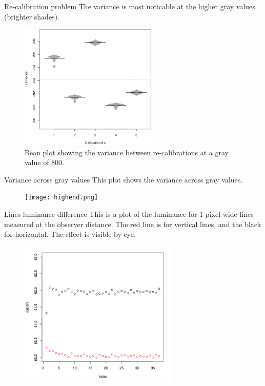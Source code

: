 \documentclass{beamer}
\begin{document}
\begin{frame}[t]{Re-calibration problem}
The variance is most noticable at the higher gray values (brighter shades).

\begin{figure}[c]
\includegraphics[height=6cm]{cbeanplotmean_800_color.png}
\caption{Bean plot showing the variance between re-calibrations at a gray value of 800.}
\end{figure}
\end{frame}

\begin{frame}[t]{Variance across gray values}
This plot shows the variance across gray values.
\begin{figure}[c]
\texttt{[image: highend.png]}
\end{figure}
\end{frame}



\begin{frame}[t]{Lines luminance difference}
This is a plot of the luminance for 1-pixel wide lines measured at the observer distance. The red line is for vertical lines, and the black for horizontal. The effect is visible by eye.
\begin{figure}[c]
\includegraphics[height=7cm]{line1dist.png}
\end{figure}
\end{frame}
\end{document}
